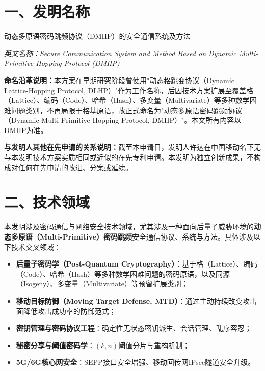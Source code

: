 ﻿\documentclass[12pt,a4paper]{article}
\begin{document}
\section*{一、发明名称}

动态多原语密码跳频协议（DMHP）的安全通信系统及方法

\textit{英文名称：Secure Communication System and Method Based on Dynamic Multi-Primitive Hopping Protocol (DMHP)}

\textbf{命名沿革说明：}本方案在早期研究阶段曾使用"动态格跳变协议（Dynamic Lattice-Hopping Protocol, DLHP）"作为工作名称，后因技术方案扩展至覆盖格（Lattice）、编码（Code）、哈希（Hash）、多变量（Multivariate）等多种数学困难问题类别，不再局限于格基原语，故正式命名为"动态多原语密码跳频协议（Dynamic Multi-Primitive Hopping Protocol, DMHP）"。本文所有内容以DMHP为准。

\textbf{与发明人其他在先申请的关系说明：}截至本申请日，发明人许达在中国移动名下无与本发明技术方案实质相同或近似的在先专利申请。本发明为独立创新成果，不构成对任何在先申请的改进、分案或延续。

\section*{二、技术领域}

本发明涉及密码通信与网络安全技术领域，尤其涉及一种面向后量子威胁环境的\textbf{动态多原语（Multi-Primitive）密码跳频}安全通信协议、系统与方法。具体涉及以下技术交叉领域：

\begin{itemize}[noitemsep]
    \item \textbf{后量子密码学（Post-Quantum Cryptography）}：基于格（Lattice）、编码（Code）、哈希（Hash）等多种数学困难问题的密码原语，以及同源（Isogeny）、多变量（Multivariate）等预留扩展类别；
    \item \textbf{移动目标防御（Moving Target Defense, MTD）}：通过主动持续改变攻击面降低攻击成功率的防御范式；
    \item \textbf{密钥管理与密码协议工程}：确定性无状态密钥派生、会话管理、乱序容忍；
    \item \textbf{秘密分享与阈值密码学}：$(k,n)$阈值分片与重构机制；
    \item \textbf{5G/6G核心网安全}：SEPP接口安全增强、移动回传网IPsec隧道安全升级。
\end{itemize}
\end{document}
